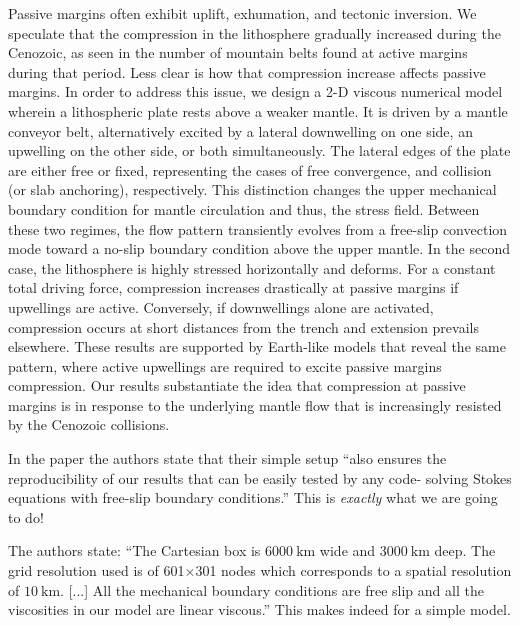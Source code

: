 \begin{center}
\begin{minipage}{13cm}
{\small 
Passive margins often exhibit uplift, exhumation, and tectonic inversion. We speculate
that the compression in the lithosphere gradually increased during the Cenozoic, as seen in
the number of mountain belts found at active margins during that period. Less clear is how
that compression increase affects passive margins. In order to address this issue, we design a
2-D viscous numerical model wherein a lithospheric plate rests above a weaker mantle. It is
driven by a mantle conveyor belt, alternatively excited by a lateral downwelling on one side,
an upwelling on the other side, or both simultaneously. The lateral edges of the plate are
either free or fixed, representing the cases of free convergence, and collision (or slab
anchoring), respectively. This distinction changes the upper mechanical boundary condition
for mantle circulation and thus, the stress field. Between these two regimes, the flow pattern
transiently evolves from a free-slip convection mode toward a no-slip boundary condition
above the upper mantle. In the second case, the lithosphere is highly stressed horizontally
and deforms. For a constant total driving force, compression increases drastically at passive
margins if upwellings are active. Conversely, if downwellings alone are activated,
compression occurs at short distances from the trench and extension prevails elsewhere.
These results are supported by Earth-like models that reveal the same pattern, where active
upwellings are required to excite passive margins compression. Our results substantiate the
idea that compression at passive margins is in response to the underlying mantle flow that is
increasingly resisted by the Cenozoic collisions.}
\end{minipage}
\end{center}
 




In the paper the authors state that their simple setup
``also ensures the reproducibility of our results that can be easily tested by any code-
solving Stokes equations with free-slip boundary conditions.''
This is {\it exactly} what we are going to do!

The authors state: ``The Cartesian box is $6000~\si{\km}$ wide and $3000~\si{\km}$
deep. The grid resolution used is of 601$\times$301 nodes which
corresponds to a spatial resolution of $10~\si{\km}$. [...] 
All the mechanical boundary conditions are free slip and all the viscosities 
in our model are linear viscous.'' This makes indeed for a simple model.

